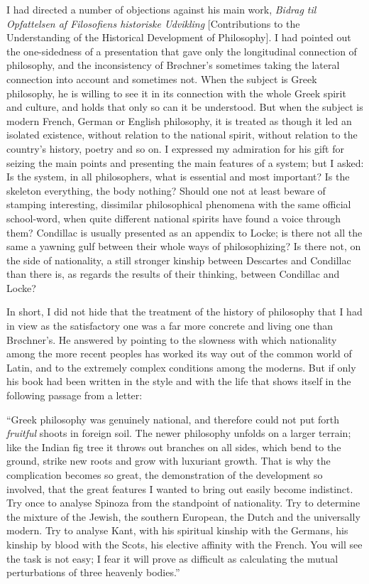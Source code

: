\documentclass[12pt,a4paper,openany]{book}
\newcommand{\opage}[1]{\marginnote{\footnotesize\textit{[#1]}}}
\begin{document}
I had directed a number of objections against his main work, \textit{Bidrag
til Opfattelsen af Filosofiens historiske Udvikling} [Contributions to the
Understanding of the Historical Development of Philosophy]. I had pointed out
the one-sidedness of a presentation that gave only the longitudinal connection
of philosophy, and the inconsistency of Brøchner's sometimes taking the lateral
connection into account and sometimes not. When the subject is Greek
philosophy, he is willing to see it in its connection with the whole Greek
spirit and culture, and holds that only so can it be understood. But when the
subject is modern French, German or English philosophy, it is treated as though
it led an isolated existence, without relation to the national spirit, without
relation to the country's history, poetry and so on. I expressed my admiration
for his gift for seizing the main points and presenting the main features of a
system; but I asked: Is the system, in all philosophers, what is essential and
most important? Is the skeleton everything, the body nothing? Should one not
at least beware of stamping interesting, dissimilar philosophical phenomena
with
\opage{251}the same official school-word, when quite different national spirits have
found a voice through them? Condillac is usually presented as an appendix to
Locke; is there not all the same a yawning gulf between their whole ways of
philosophizing? Is there not, on the side of nationality, a still stronger
kinship between Descartes and Condillac than there is, as regards the results of
their thinking, between Condillac and Locke?

In short, I did not hide that the treatment of the history of philosophy that
I had in view as the satisfactory one was a far more concrete and living one
than Brøchner's. He answered by pointing to the slowness with which nationality
among the more recent peoples has worked its way out of the common world of
Latin, and to the extremely complex conditions among the moderns. But if only
his book had been written in the style and with the life that shows itself in
the following passage from a letter:

``Greek philosophy was genuinely national, and therefore could not put forth
\emph{fruitful} shoots in foreign soil. The newer philosophy unfolds on a
larger terrain; like the Indian fig tree it throws out branches on all sides,
which bend to the ground, strike new roots and grow with luxuriant growth.
That is why the complication becomes so great, the demonstration of the
development so involved,
\opage{252}that the great features I wanted to bring out easily become indistinct.
Try once to analyse Spinoza from the standpoint of nationality. Try to
determine the mixture of the Jewish, the southern European, the Dutch and the
universally modern. Try to analyse Kant, with his spiritual kinship with the
Germans, his kinship by blood with the Scots, his elective affinity with the
French. You will see the task is not easy; I fear it will prove as difficult as
calculating the mutual perturbations of three heavenly bodies.''
\end{document}

